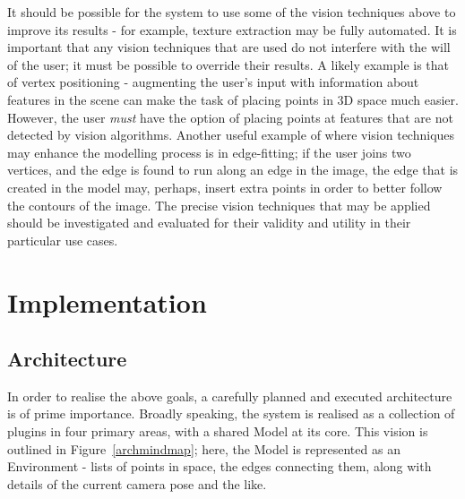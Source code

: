 \documentclass[a4paper,10pt]{article}
\begin{document}
It should be possible for the system to use some of the vision techniques above to improve its results - for example, texture extraction may be fully automated. It is important that any vision techniques that are used do not interfere with the will of the user; it must be possible to override their results. A likely example is that of vertex positioning - augmenting the user's input with information about features in the scene can make the task of placing points in 3D space much easier. However, the user \textit{must} have the option of placing points at features that are not detected by vision algorithms. Another useful example of where vision techniques may enhance the modelling process is in edge-fitting; if the user joins two vertices, and the edge is found to run along an edge in the image, the edge that is created in the model may, perhaps, insert extra points in order to better follow the contours of the image. The precise vision techniques that may be applied should be investigated and evaluated for their validity and utility in their particular use cases.

\clearpage

\section{Implementation}
\subsection{Architecture}
In order to realise the above goals, a carefully planned and executed architecture is of prime importance. Broadly speaking, the system is realised as a collection of plugins in four primary areas, with a shared Model at its core. This vision is outlined in Figure~\ref{archmindmap}; here, the Model is represented as an Environment - lists of points in space, the edges connecting them, along with details of the current camera pose and the like.
\end{document}
